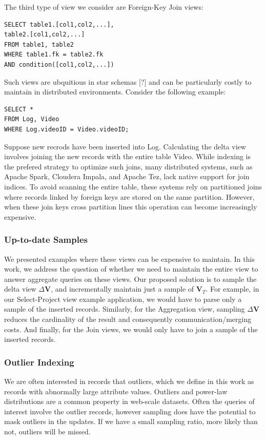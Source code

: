 The third type of view we consider are Foreign-Key Join views:

\begin{lstlisting}
SELECT table1.[col1,col2,...], 
table2.[col1,col2,...]
FROM table1, table2 
WHERE table1.fk = table2.fk 
AND condition([col1,col2,...]) 
\end{lstlisting}

Such views are ubquitious in star schemas {[}?{]} and can be particularly
costly to maintain in distributed environments. Consider the following example:

\begin{lstlisting}
SELECT * 
FROM Log, Video 
WHERE Log.videoID = Video.videoID;
\end{lstlisting}

Suppose new recrods have been inserted into Log. Calculating the
delta view involves joining the new records with the entire table Video.
While indexing is the prefered strategy to optimize such joins, many
distributed systems, such as Apache Spark, Cloudera Impala, and Apache
Tez, lack native support for join indices. To avoid scanning the entire
table, these systems rely on partitioned joins where records linked
by foreign keys are stored on the same partition. However, when these
join keys cross partition lines this operation can become increasingly
expensive.

\subsubsection{Up-to-date Samples}
We presented examples where these views can be expensive to maintain.
In this work, we address the question of whether we need to maintain
the entire view to answer aggregate queries on these views. Our proposed
solution is to sample the delta view $\Delta\textbf{V}$, and incrementally
maintain just a sample of $\textbf{V}_{T}$. For example, in our Select-Project
view example application, we would have to parse only a sample of
the inserted records. Similarly, for the Aggregation view, sampling
$\Delta\textbf{V}$ reduces the cardinality of the result and consequently
communication/merging costs. And finally, for the Join views, we would
only have to join a sample of the inserted records. 

\subsubsection{Outlier Indexing}
We are often interested in records that outliers, 
which we define in this work as records with abnormally large attribute values.
Outliers and power-law distributions are a common property in web-scale datasets.
Often the queries of interest involve the outlier records, however sampling does 
have the potential to mask outliers in the updates.
If we have a small sampling ratio, more likely than not, outliers will be missed.

